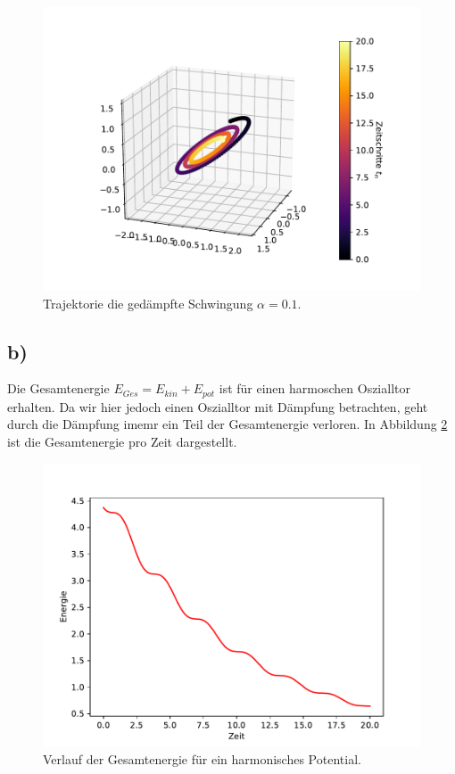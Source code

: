 \begin{figure}[H]
  \centering
  \includegraphics[scale=0.7]{A2/plots/aufg1_a4.pdf}
  \caption{Trajektorie die gedämpfte Schwingung $\alpha = 0.1$.}
  \label{fig:gedämpft}
\end{figure}

\subsection*{b)}
Die Gesamtenergie $E_{Ges} = E_{kin} + E_{pot}$ ist für einen harmoschen Oszialltor erhalten. Da wir hier jedoch einen Oszialltor mit Dämpfung betrachten, geht durch die Dämpfung imemr ein Teil der Gesamtenergie verloren.
In Abbildung \ref{fig:energie} ist die Gesamtenergie pro Zeit dargestellt.

\begin{figure}
  \centering
  \includegraphics[scale=0.7]{A2/plots/Energie.pdf}
  \caption{Verlauf der Gesamtenergie für ein harmonisches Potential.}
  \label{fig:energie}
\end{figure}

